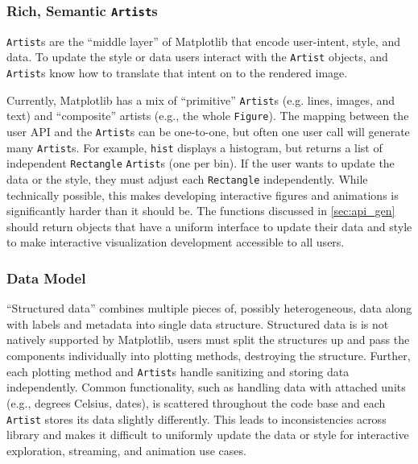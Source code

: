 \documentclass[11pt]{article}  %
\begin{document}
\subsubsection{Rich, Semantic \texttt{Artist}s}
\label{sec:artists}
\texttt{Artist}s are the ``middle layer'' of Matplotlib that encode
user-intent, style, and data.
To update the style or data users interact with the \texttt{Artist}
objects, and \texttt{Artist}s know how to
translate that intent on to the rendered image.

Currently, Matplotlib has a mix of ``primitive'' \texttt{Artist}s
(e.g. lines, images, and text) and ``composite'' artists (e.g.,
the whole \texttt{Figure}).
The mapping between the user API and the \texttt{Artist}s can be
one-to-one, but often one user call will generate many
\texttt{Artist}s.  For example, \texttt{hist} displays a histogram,
but returns a list of independent \texttt{Rectangle} \texttt{Artist}s
(one per bin).  If the user wants to update the data or the style,
they must adjust each \texttt{Rectangle} independently.  While
technically possible, this makes developing interactive figures and
animations is significantly harder than it should be.  The
functions discussed in \ref{sec:api_gen} should return objects that
have a uniform interface to update their data and style to make
interactive visualization development accessible to all users.



\subsubsection{Data Model}
\label{sec:dm}

``Structured data'' combines multiple pieces of, possibly
heterogeneous, data along with labels and metadata into single data
structure.  Structured data is is not natively supported by
Matplotlib, users must split the structures up and pass the components
individually into plotting methods, destroying the structure.
Further, each plotting method and \texttt{Artist}s handle sanitizing
and storing data independently.  Common functionality, such as
handling data with attached units (e.g., degrees Celsius, dates), is
scattered throughout the code base and each \texttt{Artist} stores its
data slightly differently.  This leads to inconsistencies across
library and makes it difficult to uniformly update the data or style
for interactive exploration, streaming, and animation use cases.
\end{document}
